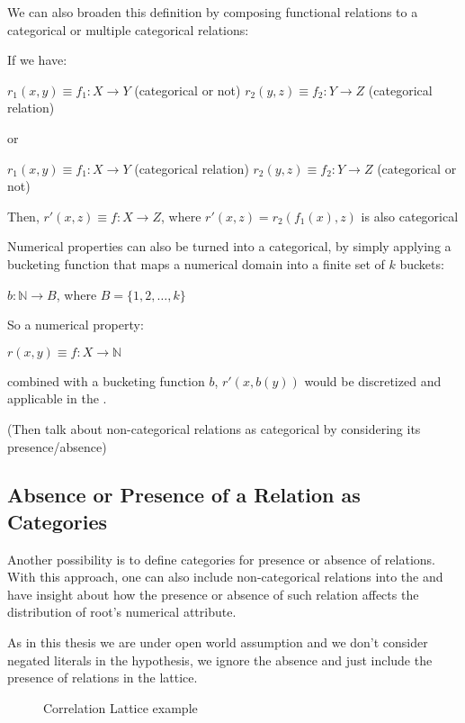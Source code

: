 We can also broaden this definition by composing functional relations to a categorical or multiple categorical relations:

If we have:

$r_1(x,y) \equiv f_1 : X \rightarrow Y$ (categorical or not) \newline
$r_2(y,z) \equiv f_2 : Y \rightarrow Z$ (categorical relation)

or

$r_1(x,y) \equiv f_1 : X \rightarrow Y$ (categorical relation) \newline
$r_2(y,z) \equiv f_2 : Y \rightarrow Z$ (categorical or not)

Then, $r'(x,z) \equiv f : X \rightarrow Z$, where $r'(x,z)=r_2(f_1(x),z)$ is also categorical


Numerical properties can also be turned into a categorical, by simply applying a bucketing function that maps a numerical domain into a finite set of $k$ buckets:

$b: \mathbb{N} \rightarrow B$, where $B=\{1,2,\dots ,k \}$

So a numerical property:

$r(x,y) \equiv f : X \rightarrow \mathbb{N}$ 

combined with a bucketing function $b$, $r'(x,b(y))$ would be discretized and applicable in the \graphname.

(Then talk about non-categorical relations as categorical by considering its presence/absence)

\subsection{Absence or Presence of a Relation as Categories}

Another possibility is to define categories for presence or absence of relations. With this approach, one can also include non-categorical relations into the \graphname and have insight about how the presence or absence of such relation affects the distribution of root's numerical attribute.

As in this thesis we are under open world assumption and we don't consider negated literals in the hypothesis, we ignore the absence and just include the presence of relations in the lattice.

\begin{figure}[!h]
  \caption{Correlation Lattice example}
  \centering
  
  \label{fig:presence}
\end{figure}

